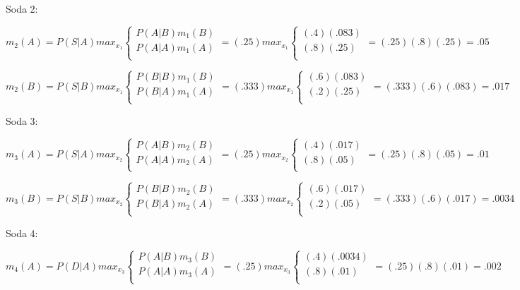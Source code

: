 \documentclass[fleqn]{hermans-hw}
\begin{document}
\begin{enumerate}
	Soda 2:
	
	$m_2(A) = P(S|A) max_{x_1}
	\begin{cases} 
	P(A|B) m_1(B) \\
	P(A|A) m_1(A) \\
	\end{cases}
	 =
	(.25) max_{x_1} \begin{cases} 
	(.4) (.083) \\
	(.8) (.25) \\
	\end{cases} = (.25)(.8)(.25) = .05
	$
	
	$m_2(B) = P(S|B) max_{x_1}
	\begin{cases} 
	P(B|B) m_1(B) \\
	P(B|A) m_1(A) \\
	\end{cases}
	=
	(.333) max_{x_1} \begin{cases} 
	(.6) (.083) \\
	(.2) (.25) \\
	\end{cases} = (.333)(.6)(.083) = .017
	$

	\bigbreak
	
	Soda 3:
	
	$m_3(A) = P(S|A) max_{x_2}
	\begin{cases} 
	P(A|B) m_2(B) \\
	P(A|A) m_2(A) \\
	\end{cases}
	=
	(.25) max_{x_2} \begin{cases} 
	(.4) (.017) \\
	(.8) (.05) \\
	\end{cases} = (.25)(.8)(.05) = .01
	$
	
	$m_3(B) = P(S|B) max_{x_2}
	\begin{cases} 
	P(B|B) m_2(B) \\
	P(B|A) m_2(A) \\
	\end{cases}
	=
	(.333) max_{x_2} \begin{cases} 
	(.6) (.017) \\
	(.2) (.05) \\
	\end{cases} = (.333)(.6)(.017) = .0034
	$
	
	\bigbreak
	
	Soda 4:
	
	$m_4(A) = P(D|A) max_{x_3}
	\begin{cases} 
	P(A|B) m_3(B) \\
	P(A|A) m_3(A) \\
	\end{cases}
	=
	(.25) max_{x_3} \begin{cases} 
	(.4) (.0034) \\
	(.8) (.01) \\
	\end{cases} = (.25)(.8)(.01) = .002
	$
	

\end{enumerate}
\end{document}
